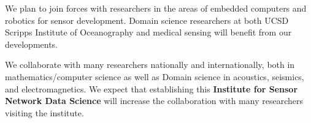 \documentclass{article}
\begin{document}
We plan to join forces with researchers in the areas of embedded
computers and  robotics for sensor development. Domain science researchers  at both UCSD Scripps Institute of Oceanography and medical sensing will benefit from our developments.

We collaborate with many researchers nationally and  internationally, both in mathematics/computer science as well as Domain science in acoustics, seismics, and electromagnetics. We expect that establishing this {\bf Institute for  Sensor Network Data Science} will increase the collaboration with many researchers visiting the institute.

\vspace{1cm}


    
    
\end{document}
